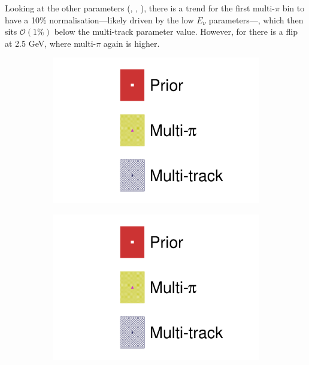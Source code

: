 Looking at the other parameters (\nue, \numubar, \nuebar), there is a trend for the first multi-$\pi$ bin to have a 10\% normalisation---likely driven by the low $E_\nu$ \numu parameters---, which then sits $\mathcal{O}(1\%)$ below the multi-track parameter value. However, for \nue there is a flip at 2.5 GeV, where multi-$\pi$ again is higher.
\begin{figure}[h]
	\centering
\begin{subfigure}[t]{0.1\textwidth}
	\includegraphics[width=\textwidth,page=1, trim={0mm 130mm 40mm 0mm}, clip]{figures/mach3/2018/data/2018a_FixedCov_RedCov_Mpi_Data_merg_2018a_NewDetMatrix_OrderSwitched_Data2to8_ActualData_merge}
\end{subfigure}
\begin{subfigure}[t]{0.1\textwidth}
	\includegraphics[width=\textwidth,page=1, trim={0mm 65mm 40mm 70mm}, clip]{figures/mach3/2018/data/2018a_FixedCov_RedCov_Mpi_Data_merg_2018a_NewDetMatrix_OrderSwitched_Data2to8_ActualData_merge}

\end{subfigure}
\end{figure}
